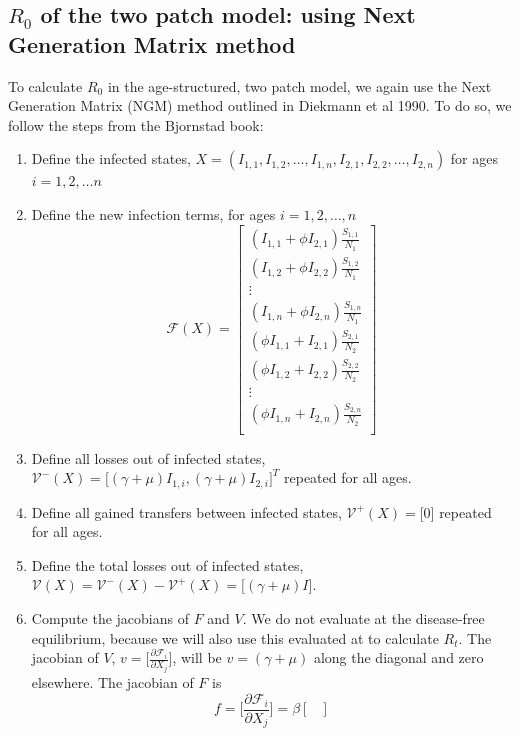 \documentclass[12pt]{article}
\begin{document}
\subsection{$R_0$ of the two patch model: using Next Generation Matrix method}
To calculate $R_0$ in the age-structured, two patch model, we again use the Next Generation Matrix (NGM) method outlined in Diekmann et al 1990. To do so, we follow the steps from the Bjornstad book:
\begin{enumerate}
    \item Define the infected states, $X = (I_{1,1}, I_{1,2}, \ldots, I_{1,n}, I_{2,1}, I_{2,2}, \ldots, I_{2,n})$ for ages $i = 1, 2, \ldots n$
    \item Define the new infection terms, for ages $i = 1, 2, \ldots, n$
    \[
   \mathcal{F}(X) = \begin{bmatrix}
   (I_{1,1} + \phi I_{2,1}) \frac{S_{1,1}}{N_1}\\
   (I_{1,2} + \phi I_{2,2}) \frac{S_{1,2}}{N_1}\\
   \vdots \\
    (I_{1,n} + \phi I_{2,n}) \frac{S_{1,n}}{N_1} \\
    (\phi I_{1,1} + I_{2,1}) \frac{S_{2,1}}{N_2}\\
    (\phi I_{1,2} + I_{2,2}) \frac{S_{2,2}}{N_2}\\
    \vdots \\
    (\phi I_{1,n} + I_{2,n}) \frac{S_{2,n}}{N_2}\\
    \end{bmatrix}
    \]
    \item Define all losses out of infected states, $\mathcal{V}^-(X) = \Big[ (\gamma + \mu) I_{1,i}, (\gamma + \mu) I_{2,i} \Big]^T$ repeated for all ages.
    \item Define all gained transfers between infected states, $\mathcal{V}^+(X) = \Big[ 0 \Big]$ repeated for all ages.
    \item Define the total losses out of infected states, $\mathcal{V}(X) = \mathcal{V}^-(X) - \mathcal{V}^+(X) = \Big[ (\gamma + \mu) I \Big]$.
    \item Compute the jacobians of $F$ and $V$. We do not evaluate at the disease-free equilibrium, because we will also use this  evaluated at to calculate $R_t$. The jacobian of $V$, $v = \Big[\frac{\partial \mathcal{F}_i}{\partial X_j}\Big]$, will be $v = (\gamma + \mu)$ along the diagonal and zero elsewhere.  
    The jacobian of $F$ is
    \[
    f = \Big[\frac{\partial \mathcal{F}_i}{\partial X_j}\Big] = \beta 
    \begin{bmatrix}

\end{bmatrix}\]
\end{enumerate}
\end{document}
